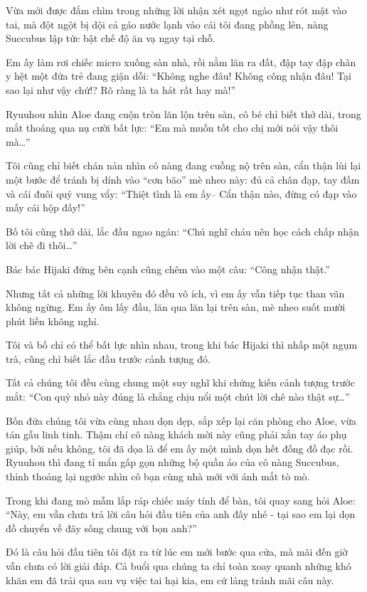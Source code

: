 \documentclass[../main.tex]{subfiles}
\begin{document}
Vừa mới được đắm chìm trong những lời nhận xét ngọt ngào như rót mật vào tai, mà đột ngột bị dội cả gáo nước lạnh vào cái tôi đang phồng lên, nàng Succubus lập tức bật chế độ ăn vạ ngay tại chỗ.

Em ấy làm rơi chiếc micro xuống sàn nhà, rồi nằm lăn ra đất, đập tay đập chân y hệt một đứa trẻ đang giận dỗi: ``Không nghe đâu! Không công nhận đâu! Tại sao lại như vậy chứ!? Rõ ràng là ta hát rất hay mà!''

Ryuuhou nhìn Aloe đang cuộn tròn lăn lộn trên sàn, cô bé chỉ biết thở dài, trong mắt thoáng qua nụ cười bất lực: ``Em mà muốn tốt cho chị mới nói vậy thôi mà\dots''

Tôi cũng chỉ biết chán nản nhìn cô nàng đang cuồng nộ trên sàn, cẩn thận lùi lại một bước để tránh bị dính vào ``cơn bão'' mè nheo này: đủ cả chân đạp, tay đấm và cái đuôi quỷ vung vẩy: ``Thiệt tình là em ấy-- Cẩn thận nào, đừng có đạp vào mấy cái hộp đấy!''

Bố tôi cũng thở dài, lắc đầu ngao ngán: ``Chú nghĩ cháu nên học cách chấp nhận lời chê đi thôi\dots''

Bác bác Hijaki đứng bên cạnh cũng chêm vào một câu: ``Công nhận thật.''

Nhưng tất cả những lời khuyên đó đều vô ích, vì em ấy vẫn tiếp tục than vãn không ngừng. Em ấy ôm lấy đầu, lăn qua lăn lại trên sàn, mè nheo suốt mười phút liền không nghỉ.

Tôi và bố chỉ có thể bất lực nhìn nhau, trong khi bác Hijaki thì nhấp một ngụm trà, cũng chỉ biết lắc đầu trước cảnh tượng đó.

Tất cả chúng tôi đều cùng chung một suy nghĩ khi chứng kiến cảnh tượng trước mắt: ``Con quỷ nhỏ này đúng là chẳng chịu nổi một chút lời chê nào thật sự\dots''

\ct

Bốn đứa chúng tôi vừa cùng nhau dọn dẹp, sắp xếp lại căn phòng cho Aloe, vừa tán gẫu linh tinh. Thậm chí cô nàng khách mời này cũng phải xắn tay áo phụ giúp, bởi nếu không, tôi đã dọa là để em ấy một mình dọn hết đống đồ đạc rồi. Ryuuhou thì đang tỉ mẩn gấp gọn những bộ quần áo của cô nàng Succubus, thỉnh thoảng lại ngước nhìn cô bạn cùng nhà mới với ánh mắt tò mò.

Trong khi đang mò mẫm lắp ráp chiếc máy tính để bàn, tôi quay sang hỏi Aloe: ``Này, em vẫn chưa trả lời câu hỏi đầu tiên của anh đấy nhé - tại sao em lại dọn đồ chuyển về đây sống chung với bọn anh?''

Đó là câu hỏi đầu tiên tôi đặt ra từ lúc em mới bước qua cửa, mà mãi đến giờ vẫn chưa có lời giải đáp. Cả buổi qua chúng ta chỉ toàn xoay quanh những khó khăn em đã trải qua sau vụ việc tai hại kia, em cứ lảng tránh mãi câu này.
\end{document}
